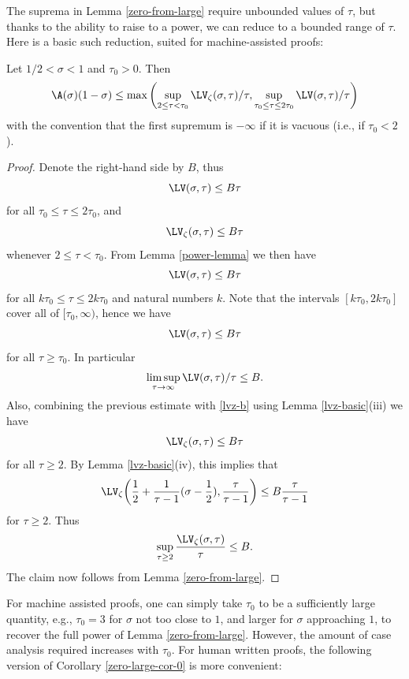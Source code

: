 The suprema in Lemma \ref{zero-from-large} require unbounded values of $\tau$, but thanks to the ability to raise to a power, we can reduce to a bounded range of $\tau$.  Here is a basic such reduction, suited for machine-assisted proofs:

\begin{corollary}\label{zero-large-cor-0} Let $1/2 < \sigma < 1$ and $\tau_0 > 0$.  Then
    $$ \A(\sigma)(1-\sigma) \leq \max \left(\sup_{2 \leq \tau < \tau_0} \LV_\zeta(\sigma,\tau)/\tau, \sup_{\tau_0 \leq \tau \leq 2\tau_0} \LV(\sigma,\tau)/\tau\right)$$
    with the convention that the first supremum is $-\infty$ if it is vacuous (i.e., if $\tau_0 < 2$).
\end{corollary}

\begin{proof}
Denote the right-hand side by $B$, thus
    $$ \LV(\sigma,\tau) \leq B\tau$$
    for all $\tau_0 \leq \tau \leq 2\tau_0$, and
    \begin{equation}\label{lvz-b}
         \LV_\zeta(\sigma,\tau) \leq B\tau
    \end{equation}
    whenever $2 \leq \tau < \tau_0$.  From Lemma \ref{power-lemma} we then have
    $$ \LV(\sigma,\tau) \leq B\tau$$
    for all $k\tau_0 \leq \tau \leq 2k\tau_0$ and natural numbers $k$. Note that the intervals $[k\tau_0, 2k\tau_0]$ cover all of $[\tau_0,\infty)$, hence we have
    $$ \LV(\sigma,\tau) \leq B\tau$$
    for all $\tau \geq \tau_0$. In particular
    $$ \limsup_{\tau \to \infty} \LV(\sigma,\tau)/\tau  \leq B.$$
    Also, combining the previous estimate with \eqref{lvz-b} using Lemma \ref{lvz-basic}(iii) we have
    \begin{equation}\label{lvzo}
     \LV_\zeta(\sigma,\tau) \leq B\tau
    \end{equation}
    for all $\tau \geq 2$.  By Lemma \ref{lvz-basic}(iv), this implies that
    $$ \LV_\zeta\bigg(\frac{1}{2} + \frac{1}{\tau-1} (\sigma-\frac{1}{2}), \frac{\tau}{\tau-1} \bigg) \leq B \frac{\tau}{\tau-1}$$
    for $\tau \geq 2$.  Thus
    $$ \sup_{\tau \geq 2} \frac{\LV_\zeta(\sigma,\tau)}{\tau} \leq B.$$
    The claim now follows from Lemma \ref{zero-from-large}.
\end{proof}

For machine assisted proofs, one can simply take $\tau_0$ to be a sufficiently large quantity, e.g., $\tau_0=3$ for $\sigma$ not too close to $1$, and larger for $\sigma$ approaching $1$, to recover the full power of Lemma \ref{zero-from-large}.  However, the amount of case analysis required increases with $\tau_0$.  For human written proofs, the following version of Corollary \ref{zero-large-cor-0} is more convenient:

